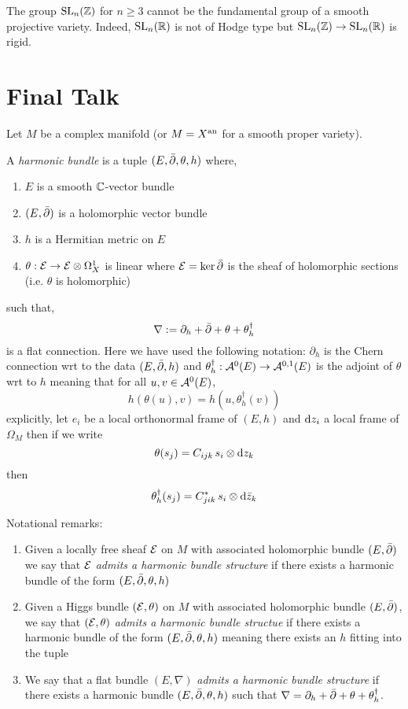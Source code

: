 \documentclass[12pt]{article}
\begin{document}
\begin{example}
The group $\mathrm{SL}_n(\mathbb{Z})$ for $n \ge 3$ cannot be the fundamental group of a smooth projective variety. Indeed, $\mathrm{SL}_n(\mathbb{R})$ is not of Hodge type but $\mathrm{SL}_n(\mathbb{Z}) \to \mathrm{SL}_n(\mathbb{R})$ is rigid. 
\end{example}
\section{Final Talk}

Let $M$ be a complex manifold (or $M = X^{\mathrm{an}}$ for a smooth proper variety).

\begin{defn}
A \textit{harmonic bundle} is a tuple $(E, \bar{\partial}, \theta, h)$ where,
\begin{enumerate}
\item $E$ is a smooth $\mathbb{C}$-vector bundle
\item $(E, \bar{\partial})$ is a holomorphic vector bundle
\item $h$ is a Hermitian metric on $E$
\item $\theta : \mathcal{E} \to \mathcal{E} \otimes \Omega^1_X$ is linear where $\mathcal{E} = \ker{\bar{\partial}}$ is the sheaf of holomorphic sections (i.e. $\theta$ is holomorphic)
\end{enumerate}
such that,
\[ \nabla := \partial_h + \bar{\partial} + \theta + \theta^\dagger_h \]
is a flat connection. Here we have used the following notation: $\partial_h$ is the Chern connection wrt to the data $(E, \bar{\partial}, h)$ and $\theta_h^\dagger : \mathcal{A}^0(E) \to \mathcal{A}^{0,1}(E)$ is the adjoint of $\theta$ wrt to $h$ meaning that for all $u,v \in \mathcal{A}^0(E)$,
\[ h(\theta(u), v) = h(u, \theta^\dagger_h(v)) \]
explicitly, let $e_i$ be a local orthonormal frame of $(E, h)$ and $\mathrm{d}{z_i}$ a local frame of $\Omega_M$ then if we write
\[ \theta(s_j) = C_{ijk} \, s_i \otimes \mathrm{d}{z_k} \]
then
\[ \theta^\dagger_h(s_j) = C_{jik}^* \, s_i \otimes \mathrm{d}{\bar{z}_k} \]
\end{defn}

\begin{rmk}
Notational remarks:
\begin{enumerate}
\item Given a locally free sheaf $\mathcal{E}$ on $M$ with associated holomorphic bundle $(E, \bar{\partial})$ we say that $\mathcal{E}$ \textit{admits a harmonic bundle structure} if there exists a harmonic bundle of the form $(E, \bar{\partial}, \theta, h)$

\item Given a Higgs bundle $(\mathcal{E}, \theta)$ on $M$ with associated holomorphic bundle $(E, \bar{\partial})$, we say that $(\mathcal{E}, \theta)$ \textit{admits a harmonic bundle structue} if there exists a harmonic bundle of the form $(E, \bar{\partial}, \theta, h)$ meaning there exists an $h$ fitting into the tuple

\item We say that a flat bundle $(E, \nabla)$ \textit{admits a harmonic bundle structure} if there exists a harmonic bundle $(E, \bar{\partial}, \theta, h)$ such that $\nabla = \partial_h + \bar{\partial} + \theta + \theta_h^\dagger$.
\end{enumerate}
\end{rmk}
\end{document}
